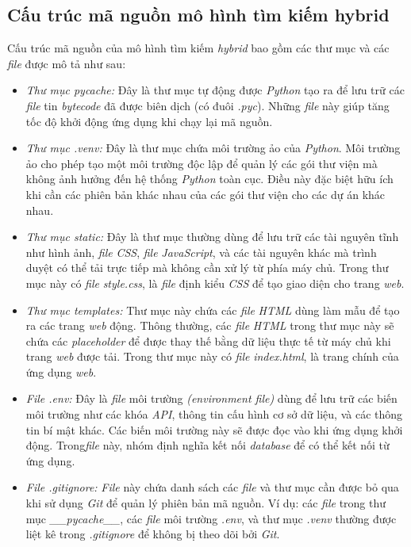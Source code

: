 \subsection{Cấu trúc mã nguồn mô hình tìm kiếm hybrid}
\hspace*{1cm}
Cấu trúc mã nguồn của mô hình tìm kiếm \textit{hybrid} bao gồm các thư mục và các \textit{file} được mô tả như sau:
\begin{itemize}
    \item \textit{Thư mục pycache:} Đây là thư mục tự động được \textit{Python} tạo ra để lưu trữ các \textit{file} tin \textit{bytecode} đã được biên dịch (có đuôi \textit{.pyc}). Những \textit{file} này giúp tăng tốc độ khởi động ứng dụng khi chạy lại mã nguồn.
    \item \textit{Thư mục .venv:} Đây là thư mục chứa môi trường ảo của \textit{Python}. Môi trường ảo cho phép tạo một môi trường độc lập để quản lý các gói thư viện mà không ảnh hưởng đến hệ thống \textit{Python} toàn cục. Điều này đặc biệt hữu ích khi cần các phiên bản khác nhau của các gói thư viện cho các dự án khác nhau.
    \item \textit{Thư mục static:} Đây là thư mục thường dùng để lưu trữ các tài nguyên tĩnh như hình ảnh, \textit{file} \textit{CSS}, \textit{file} \textit{JavaScript}, và các tài nguyên khác mà trình duyệt có thể tải trực tiếp mà không cần xử lý từ phía máy chủ. Trong thư mục này có \textit{file} \textit{style.css}, là \textit{file} định kiểu \textit{CSS} để tạo giao diện cho trang \textit{web}.
    \item \textit{Thư mục templates:} Thư mục này chứa các \textit{file} \textit{HTML} dùng làm mẫu để tạo ra các trang \textit{web} động. Thông thường, các \textit{file} \textit{HTML} trong thư mục này sẽ chứa các \textit{placeholder} để được thay thế bằng dữ liệu thực tế từ máy chủ khi trang \textit{web} được tải. Trong thư mục này có \textit{file} \textit{index.html}, là trang chính của ứng dụng \textit{web}.
    \item \textit{\textit{File} .env:} Đây là \textit{file} môi trường \textit{(environment file)} dùng để lưu trữ các biến môi trường như các khóa \textit{API}, thông tin cấu hình cơ sở dữ liệu, và các thông tin bí mật khác. Các biến môi trường này sẽ được đọc vào khi ứng dụng khởi động. Trong\textit{file} này, nhóm định nghĩa kết nối \textit{database} để có thể kết nối từ ứng dụng.
    \item \textit{\textit{File} .gitignore:} \textit{File} này chứa danh sách các \textit{file} và thư mục cần được bỏ qua khi sử dụng \textit{Git} để quản lý phiên bản mã nguồn. Ví dụ: các \textit{file} trong thư mục \textit{\_\_pycache\_\_}, các \textit{file} môi trường \textit{.env}, và thư mục \textit{.venv} thường được liệt kê trong \textit{.gitignore} để không bị theo dõi bởi \textit{Git}.

\end{itemize}
